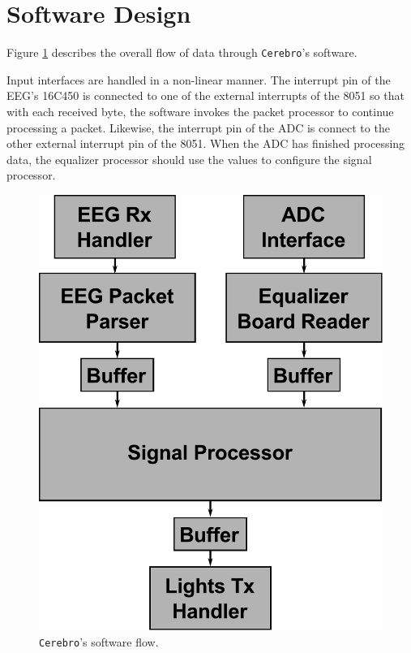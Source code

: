 \documentclass[letterpaper,10pt,notitlepage]{report}
\newcommand{\projname}{\texttt{Cerebro}}
\begin{document}
\section{Software Design}
    Figure \ref{fig:sw} describes the overall flow of data through \projname's 
    software.

    Input interfaces are handled in a non-linear manner.  The interrupt pin of 
    the EEG's 16C450 is connected to one of the external interrupts of the 
    8051 so that with each received byte, the software invokes the packet 
    processor to continue processing a packet.  Likewise, the interrupt pin of 
    the ADC is connect to the other external interrupt pin of the 8051.  When 
    the ADC has finished processing data, the equalizer processor should use 
    the values to configure the signal processor.

    \begin{figure}[h!]
    \begin{center}
        \includegraphics[scale=.3]{fig/software.pdf}
        \caption{\projname{}'s software flow.}
        \label{fig:sw}
    \end{center}
    \end{figure}
\end{document}
